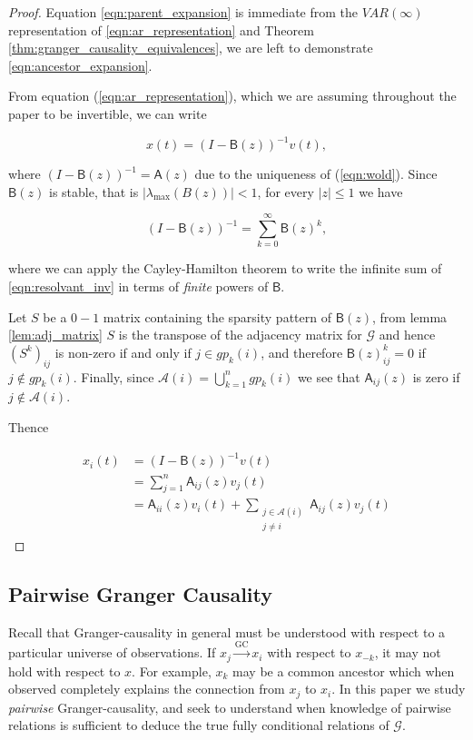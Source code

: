 \documentclass[12pt]{article}
\def\gc{\overset{\text{GC}}{\rightarrow}}  %
\def\gcg{\mathcal{G}}  %
\def\B{\mathsf{B}}  %
\def\A{\mathsf{A}}  %
\newcommand{\anc}[1]{\mathcal{A}(#1)}  %
\newcommand{\gpn}[2]{gp_{#1}(#2)}  %
\begin{document}
\begin{proof}
  Equation \eqref{eqn:parent_expansion} is immediate from the
  $VAR(\infty)$ representation of \eqref{eqn:ar_representation} and
  Theorem \ref{thm:granger_causality_equivalences}, we are left to
  demonstrate \eqref{eqn:ancestor_expansion}.
  
  From equation (\ref{eqn:ar_representation}), which we are assuming
  throughout the paper to be invertible, we can write

  \begin{equation*}
    x(t) = (I - \B(z))^{-1} v(t),
  \end{equation*}

  where $(I - \B(z))^{-1} = \A(z)$ due to the uniqueness of
  (\ref{eqn:wold}).  Since $\B(z)$ is stable, that is
  $|\lambda_{\text{max}}(B(z))| < 1$, for every $|z| \le 1$ we have

  \begin{equation}
    \label{eqn:resolvant_inv}
    (I - \B(z))^{-1} = \sum_{k = 0}^\infty \B(z)^k,
  \end{equation}

  where we can apply the Cayley-Hamilton theorem to write the infinite
  sum of \eqref{eqn:resolvant_inv} in terms of \textit{finite} powers
  of $\B$.

  Let $S$ be a $0-1$ matrix containing the sparsity pattern of
  $\B(z)$, from lemma \ref{lem:adj_matrix} $S$ is the transpose of the
  adjacency matrix for $\gcg$ and hence $(S^k)_{ij}$ is non-zero if
  and only if $j \in \gpn{k}{i}$, and therefore $\B(z)^k_{ij} = 0$ if
  $j \not \in \gpn{k}{i}$.  Finally, since
  $\anc{i} = \bigcup_{k = 1}^n\gpn{k}{i}$ we see that $\A_{ij}(z)$ is
  zero if $j \not\in \anc{i}$.

  Thence

  \begin{align*}
    x_i(t) &= (I - \B(z))^{-1}v(t)\\
    &= \sum_{j = 1}^n \A_{ij}(z) v_j(t)\\
    &= \A_{ii}(z) v_i(t) + \sum_{\substack{j \in \anc{i} \\ j \ne i}} \A_{ij}(z) v_j(t)
  \end{align*}
\end{proof}

\subsection{Pairwise Granger Causality}
\label{sec:pwgc}
Recall that Granger-causality in general must be understood with
respect to a particular universe of observations.  If $x_j \gc x_i$
with respect to $x_{-k}$, it may not hold with respect to $x$.  For
example, $x_k$ may be a common ancestor which when observed completely
explains the connection from $x_j$ to $x_i$.  In this paper we study
\textit{pairwise} Granger-causality, and seek to understand when
knowledge of pairwise relations is sufficient to deduce the true fully
conditional relations of $\gcg$.
\end{document}
